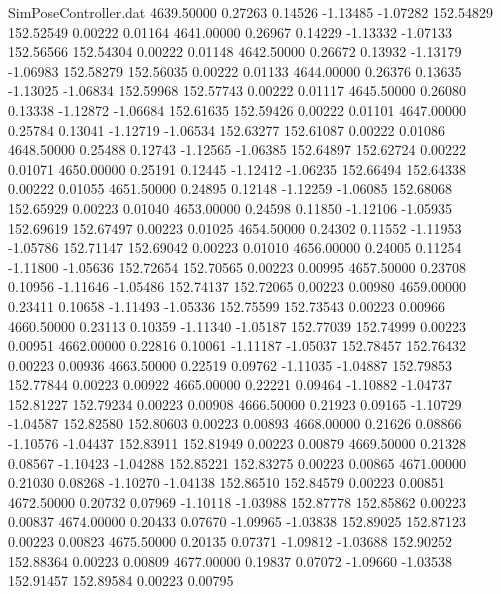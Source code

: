\begin{filecontents}{SimPoseController.dat}
4639.50000    0.27263    0.14526    -1.13485   -1.07282  152.54829  152.52549    0.00222    0.01164
4641.00000    0.26967    0.14229    -1.13332   -1.07133  152.56566  152.54304    0.00222    0.01148
4642.50000    0.26672    0.13932    -1.13179   -1.06983  152.58279  152.56035    0.00222    0.01133
4644.00000    0.26376    0.13635    -1.13025   -1.06834  152.59968  152.57743    0.00222    0.01117
4645.50000    0.26080    0.13338    -1.12872   -1.06684  152.61635  152.59426    0.00222    0.01101
4647.00000    0.25784    0.13041    -1.12719   -1.06534  152.63277  152.61087    0.00222    0.01086
4648.50000    0.25488    0.12743    -1.12565   -1.06385  152.64897  152.62724    0.00222    0.01071
4650.00000    0.25191    0.12445    -1.12412   -1.06235  152.66494  152.64338    0.00222    0.01055
4651.50000    0.24895    0.12148    -1.12259   -1.06085  152.68068  152.65929    0.00223    0.01040
4653.00000    0.24598    0.11850    -1.12106   -1.05935  152.69619  152.67497    0.00223    0.01025
4654.50000    0.24302    0.11552    -1.11953   -1.05786  152.71147  152.69042    0.00223    0.01010
4656.00000    0.24005    0.11254    -1.11800   -1.05636  152.72654  152.70565    0.00223    0.00995
4657.50000    0.23708    0.10956    -1.11646   -1.05486  152.74137  152.72065    0.00223    0.00980
4659.00000    0.23411    0.10658    -1.11493   -1.05336  152.75599  152.73543    0.00223    0.00966
4660.50000    0.23113    0.10359    -1.11340   -1.05187  152.77039  152.74999    0.00223    0.00951
4662.00000    0.22816    0.10061    -1.11187   -1.05037  152.78457  152.76432    0.00223    0.00936
4663.50000    0.22519    0.09762    -1.11035   -1.04887  152.79853  152.77844    0.00223    0.00922
4665.00000    0.22221    0.09464    -1.10882   -1.04737  152.81227  152.79234    0.00223    0.00908
4666.50000    0.21923    0.09165    -1.10729   -1.04587  152.82580  152.80603    0.00223    0.00893
4668.00000    0.21626    0.08866    -1.10576   -1.04437  152.83911  152.81949    0.00223    0.00879
4669.50000    0.21328    0.08567    -1.10423   -1.04288  152.85221  152.83275    0.00223    0.00865
4671.00000    0.21030    0.08268    -1.10270   -1.04138  152.86510  152.84579    0.00223    0.00851
4672.50000    0.20732    0.07969    -1.10118   -1.03988  152.87778  152.85862    0.00223    0.00837
4674.00000    0.20433    0.07670    -1.09965   -1.03838  152.89025  152.87123    0.00223    0.00823
4675.50000    0.20135    0.07371    -1.09812   -1.03688  152.90252  152.88364    0.00223    0.00809
4677.00000    0.19837    0.07072    -1.09660   -1.03538  152.91457  152.89584    0.00223    0.00795

\end{filecontents}
